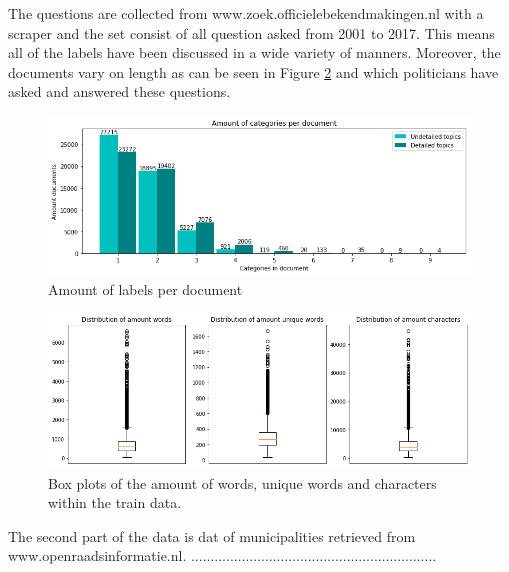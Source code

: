 The questions are collected from www.zoek.officielebekendmakingen.nl with a scraper and the set consist of all question asked from 2001 to 2017. This means all of the labels have been discussed in a wide variety of manners. Moreover, the documents vary on length as can be seen in Figure \ref{fig:WordAmount} and which politicians have asked and answered these questions.\\

\begin{figure}[H]
	\centering
  	\includegraphics[width=.9\linewidth]{TrainAmountLabels}
  	\caption{Amount of labels per document}
  	\label{fig:LabelAmount}
\end{figure}

\begin{figure}[H]
	\centering
  	\includegraphics[width=.9\linewidth]{TrainAmountWords}
  	\caption{Box plots of the amount of words, unique words and characters within the train data.}
  	\label{fig:WordAmount}
\end{figure}

The second part of the data is dat of municipalities retrieved from www.openraadsinformatie.nl. ...............................................................\\






